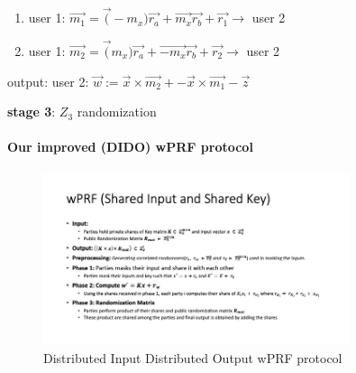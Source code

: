 \begin{algorithm}
\begin{algorithmic}
\begin{enumerate}
			\item user 1:  $  \vec{m_1} = \vec(- m_x)  \vec{r_a} + \vec{m_x} \vec{r_b} + \vec{r_1}   \rightarrow $   user 2
			
			\item user 1:  $  \vec{m_2} = \vec(m_x)  \vec{r_a} + \vec{- m_x} \vec{r_b} + \vec{r_2}  \rightarrow $   user 2
			
			
		\end{enumerate}
		
		output:  user 2: $\vec{w}:= \vec{x} \times \vec{m_2}+ - \vec{x}  \times \vec{m_1} - \vec{z}$
		
		
		\STATE  \textbf{stage 3}: $Z_3$ randomization  
		
	\end{algorithmic}
	
\end{algorithm}





\paragraph{Our improved (DIDO) wPRF protocol}

\begin{figure}[ht]
	\centering
	\includegraphics[width=0.8\textwidth]{images/sisk.jpg}
	\vspace{-2mm}
	\caption{Distributed Input Distributed Output wPRF protocol}
	\label{sisk.fig}
	\vspace{-5mm}
\end{figure}

